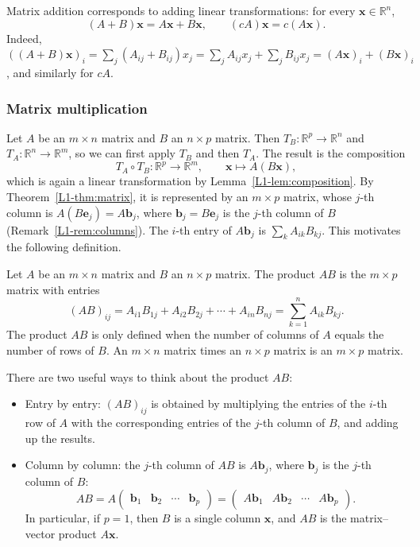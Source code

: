 \begin{remark}
    Matrix addition corresponds to adding linear transformations: for every $\mathbf{x} \in \mathbb{R}^n$,
    \[(A + B)\mathbf{x} = A\mathbf{x} + B\mathbf{x}, \qquad (cA)\mathbf{x} = c(A\mathbf{x}).\]
    Indeed, $((A + B)\mathbf{x})_i = \sum_j (A_{ij} + B_{ij}) x_j = \sum_j A_{ij} x_j + \sum_j B_{ij} x_j = (A\mathbf{x})_i + (B\mathbf{x})_i$, and similarly for $cA$.
\end{remark}

\subsubsection{Matrix multiplication}

Let $A$ be an $m \times n$ matrix and $B$ an $n \times p$ matrix. Then $T_B: \mathbb{R}^p \to \mathbb{R}^n$ and $T_A: \mathbb{R}^n \to \mathbb{R}^m$, so we can first apply $T_B$ and then $T_A$. The result is the composition
\[T_A \circ T_B: \mathbb{R}^p \to \mathbb{R}^m, \qquad \mathbf{x} \mapsto A(B\mathbf{x}),\]
which is again a linear transformation by Lemma~\ref{L1-lem:composition}. By Theorem~\ref{L1-thm:matrix}, it is represented by an $m \times p$ matrix, whose $j$-th column is $A(B\mathbf{e}_j) = A\mathbf{b}_j$, where $\mathbf{b}_j = B\mathbf{e}_j$ is the $j$-th column of $B$ (Remark~\ref{L1-rem:columns}). The $i$-th entry of $A\mathbf{b}_j$ is $\sum_{k} A_{ik} B_{kj}$. This motivates the following definition.

\begin{definition}
    Let $A$ be an $m \times n$ matrix and $B$ an $n \times p$ matrix. The product $AB$ is the $m \times p$ matrix with entries
    \[(AB)_{ij} = A_{i1} B_{1j} + A_{i2} B_{2j} + \cdots + A_{in} B_{nj} = \sum_{k=1}^n A_{ik} B_{kj}.\]
    The product $AB$ is only defined when the number of columns of $A$ equals the number of rows of $B$. An $m \times n$ matrix times an $n \times p$ matrix is an $m \times p$ matrix.
\end{definition}

\begin{remark}\label{L1-rem:two-views}
    There are two useful ways to think about the product $AB$:
    \begin{itemize}
        \item Entry by entry: $(AB)_{ij}$ is obtained by multiplying the entries of the $i$-th row of $A$ with the corresponding entries of the $j$-th column of $B$, and adding up the results.
        \item Column by column: the $j$-th column of $AB$ is $A\mathbf{b}_j$, where $\mathbf{b}_j$ is the $j$-th column of $B$:
        \[AB = A \begin{pmatrix} \mathbf{b}_1 & \mathbf{b}_2 & \cdots & \mathbf{b}_p \end{pmatrix} = \begin{pmatrix} A\mathbf{b}_1 & A\mathbf{b}_2 & \cdots & A\mathbf{b}_p \end{pmatrix}.\]
        In particular, if $p = 1$, then $B$ is a single column $\mathbf{x}$, and $AB$ is the matrix--vector product $A\mathbf{x}$.
    \end{itemize}
\end{remark}

